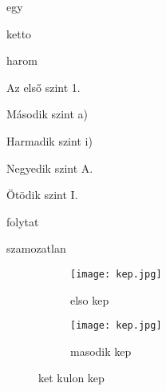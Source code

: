 \documentclass{article}
\begin{document}
\listoffigures
\listoftables
\begin{enumerate}
\begin{itemize*}[label=\textbullet,%
itemjoin*={\hspace{0.1em} és }]
\item egy
\item ketto
\item harom	
\end{itemize*}
\end{enumerate}
\begin{mynested}
    \item Az első szint 1.
    \begin{mynested}
        \item Második szint a)
        \begin{mynested}
            \item Harmadik szint i)
            \begin{mynested}
                \item Negyedik szint A.
                \begin{mynested}
                    \item Ötödik szint I.
                \end{mynested}
            \end{mynested}
        \end{mynested}
    \end{mynested}
\end{mynested}
\hulipsum [1]
\begin{mynested}[resume, label=\roman*,ref=(\roman*)]
\item folytat
\begin{mynested}[label=\roman*,ref=(\roman*)]
\item[] szamozatlan
\end{mynested}
\end{mynested}
\begin{description}[style=sameline]
    \item[] \hulipsum[1]
    \item[slanted] \hulipsum[1]
    \item[hosszu cimke] \hulipsum[1]
\end{description}
\begin{figure}[b]
  \centering
  \begin{subfigure}{0.45\textwidth}
    \texttt{[image: kep.jpg]}
    \caption{elso kep}
    \label{fig:subfig1}
  \end{subfigure}
  \begin{subfigure}{0.45\textwidth}
    \texttt{[image: kep.jpg]}
    \caption{masodik kep}
    \label{fig:subfig2}
  \end{subfigure}
  \caption{ket kulon kep}
  \label{fig:mainfig}
\end{figure}
\end{document}
